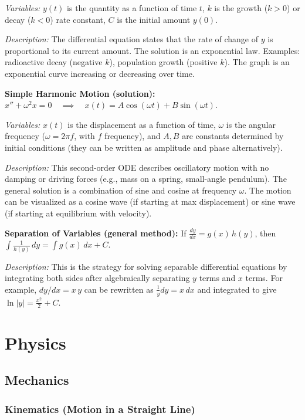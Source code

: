 \documentclass{article}
\begin{document}
\textit{Variables:} $y(t)$ is the quantity as a function of time $t$, $k$ is the growth ($k>0$) or decay ($k<0$) rate constant, $C$ is the initial amount $y(0)$.

\textit{Description:} The differential equation states that the rate of change of $y$ is proportional to its current amount. The solution is an exponential law. Examples: radioactive decay (negative $k$), population growth (positive $k$). The graph is an exponential curve increasing or decreasing over time.

\textbf{Simple Harmonic Motion (solution):} $x'' + \omega^2 x = 0 \quad\implies\quad x(t) = A \cos(\omega t) + B \sin(\omega t)$.

\textit{Variables:} $x(t)$ is the displacement as a function of time, $\omega$ is the angular frequency ($\omega = 2\pi f$, with $f$ frequency), and $A, B$ are constants determined by initial conditions (they can be written as amplitude and phase alternatively).

\textit{Description:} This second-order ODE describes oscillatory motion with no damping or driving forces (e.g., mass on a spring, small-angle pendulum). The general solution is a combination of sine and cosine at frequency $\omega$. The motion can be visualized as a cosine wave (if starting at max displacement) or sine wave (if starting at equilibrium with velocity).

\textbf{Separation of Variables (general method):} If $\frac{dy}{dx} = g(x)\,h(y)$, then $\displaystyle \int \frac{1}{h(y)}\,dy = \int g(x)\,dx + C$.

\textit{Description:} This is the strategy for solving separable differential equations by integrating both sides after algebraically separating $y$ terms and $x$ terms. For example, $dy/dx = x\,y$ can be rewritten as $\frac{1}{y}dy = x\,dx$ and integrated to give $\ln|y| = \frac{x^2}{2} + C$.

\section*{Physics}

\subsection*{Mechanics}

\subsubsection*{Kinematics (Motion in a Straight Line)}
\end{document}
